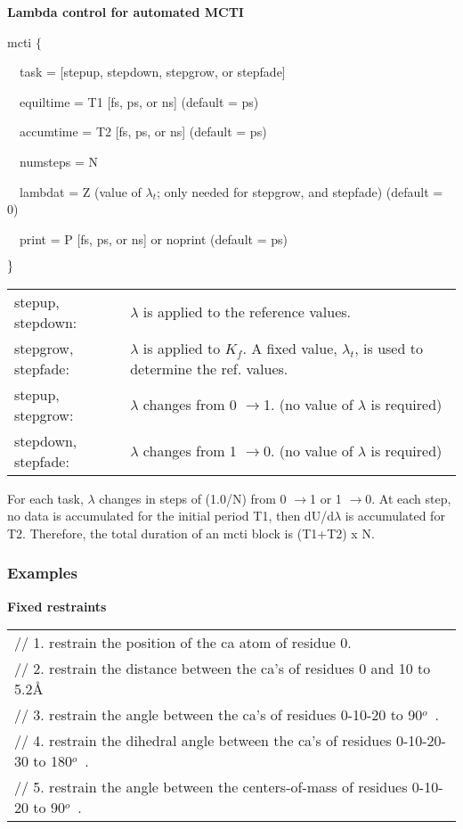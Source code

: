 {\bf Lambda control for automated MCTI}

mcti $\{$

~~task = [stepup, stepdown, stepgrow, or stepfade]

~~equiltime = T1 [fs, ps, or ns] (default = ps)

~~accumtime = T2 [fs, ps, or ns] (default = ps)

~~numsteps = N

~~lambdat = Z (value of $\lambda _{t}$; only needed for stepgrow, and
stepfade) (default = 0)

~~print = P [fs, ps, or ns] or noprint (default = ps)

$\}\medskip $

\begin{tabular}{ll}
stepup, stepdown: & $\lambda $ is applied to the reference values. \\ 
stepgrow, stepfade: & $\lambda $ is applied to $K_{f}$. A fixed value, $%
\lambda _{t}$, is used to determine the ref. values. \\ 
stepup, stepgrow: & $\lambda $ changes from 0 $\rightarrow $1. (no value of $%
\lambda $ is required) \\ 
stepdown, stepfade: & $\lambda $ changes from 1 $\rightarrow $0. (no value
of $\lambda $ is required)\medskip
\end{tabular}

For each task, $\lambda $ changes in steps of (1.0/N) from 0 $\rightarrow $1
or 1 $\rightarrow $0. At each step, no data is accumulated for the initial
period T1, then dU/d$\lambda $ is accumulated for T2. Therefore, the total
duration of an mcti block is (T1+T2) x N.

\subsubsection{Examples}

{\bf Fixed restraints}

\begin{tabular}{l}
{\footnotesize // 1. restrain the position of the ca atom of residue 0.} \\ 
{\footnotesize // 2. restrain the distance between the ca's of residues 0
and 10 to 5.2\AA } \\ 
{\footnotesize // 3. restrain the angle between the ca's of residues 0-10-20
to 90}$^{o}${\footnotesize \ .} \\ 
{\footnotesize // 4. restrain the dihedral angle between the ca's of
residues 0-10-20-30 to 180}$^{o}${\footnotesize \ .} \\ 
{\footnotesize // 5. restrain the angle between the centers-of-mass of
residues 0-10-20 to 90}$^{o}${\footnotesize \ .}
\end{tabular}

